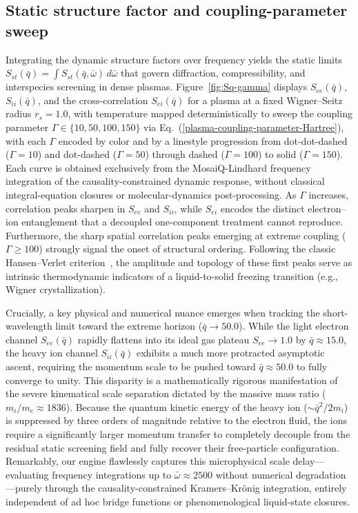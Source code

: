 \documentclass[aps,showkeys,noshowpacs,superscriptaddress,pre,preprint]{revtex4-2}
\let\label\orilabel
\begin{document}
\subsection{Static structure factor and coupling-parameter sweep}
\label{sec:static-structure-factor}

Integrating the dynamic structure factors over frequency yields the static limits
$S_{st}(\bar{q}) = \int S_{st}(\bar{q}, \bar{\omega})\, d\bar{\omega}$
that govern diffraction, compressibility, and interspecies screening in dense plasmas.
Figure~\ref{fig:Sq-gamma} displays $S_{ee}(\bar{q})$, $S_{ii}(\bar{q})$, and the cross-correlation $S_{ei}(\bar{q})$ for a plasma at a fixed Wigner--Seitz radius $r_s = 1.0$,
with temperature mapped deterministically to sweep the coupling parameter
$\Gamma \in \{10, 50, 100, 150\}$ via Eq.~(\ref{plasma-coupling-parameter-Hartree}),
with each $\Gamma$ encoded by color and by a linestyle progression from dot-dot-dashed ($\Gamma = 10$) and dot-dashed ($\Gamma = 50$) through dashed ($\Gamma = 100$) to solid ($\Gamma = 150$).
Each curve is obtained exclusively from the MosaiQ-Lindhard frequency integration of the causality-constrained dynamic response,
without classical integral-equation closures or molecular-dynamics post-processing.
As $\Gamma$ increases, correlation peaks sharpen in $S_{ee}$ and $S_{ii}$,
while $S_{ei}$ encodes the distinct electron--ion entanglement that a decoupled one-component treatment cannot reproduce.
Furthermore, the sharp spatial correlation peaks emerging at extreme coupling ($\Gamma \ge 100$) strongly signal the onset of structural ordering.
Following the classic Hansen--Verlet criterion~\cite{Asgari2001}, the amplitude and topology of these first peaks serve as intrinsic thermodynamic indicators of a liquid-to-solid freezing transition (e.g., Wigner crystallization).

Crucially, a key physical and numerical nuance emerges when tracking the short-wavelength limit toward the extreme horizon ($\bar{q} \to 50.0$).
While the light electron channel $S_{ee}(\bar{q})$ rapidly flattens into its ideal gas plateau $S_{ee} \to 1.0$ by $\bar{q} \approx 15.0$, the heavy ion channel $S_{ii}(\bar{q})$ exhibits a much more protracted asymptotic ascent, requiring the momentum scale to be pushed toward $\bar{q} \approx 50.0$ to fully converge to unity.
This disparity is a mathematically rigorous manifestation of the severe kinematical scale separation dictated by the massive mass ratio ($m_i/m_e \approx 1836$).
Because the quantum kinetic energy of the heavy ion ($\sim \bar{q}^2 / 2m_i$) is suppressed by three orders of magnitude relative to the electron fluid, the ions require a significantly larger momentum transfer to completely decouple from the residual static screening field and fully recover their free-particle configuration.
Remarkably, our engine flawlessly captures this microphysical scale delay---evaluating frequency integrations up to $\bar{\omega} \approx 2500$ without numerical degradation---purely through the causality-constrained Kramers--Kr\"onig integration, entirely independent of ad hoc bridge functions or phenomenological liquid-state closures.
\end{document}
